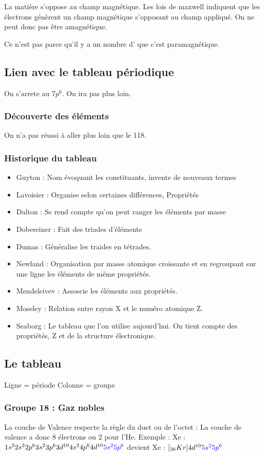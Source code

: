 \documentclass[french]{yLectureNote}
\begin{document}
La matière s'oppose au champ magnétique. Les lois de maxwell indiquent que les électrons génèrent un champ magnétique s'opposant au champ appliqué. On ne peut donc pas \^etre amagnétique.

Ce n'est pas parce qu'il y a un nombre d' que c'est paramagnétique.
\subsection{Lien avec le tableau périodique}
On s'arrete au $7p^6$. On ira pas plus loin.
\subsubsection{Découverte des éléments}
On n'a pas réussi à aller plus loin que le 118.
\subsubsection{Historique du tableau}
\begin{itemize}
 \item Guyton : Nom évoquant les constituants, invente de nouveaux termes
 \item Lavoisier : Organise selon certaines différences, Propriétés
 \item Dalton : Se rend compte qu'on peut ranger les éléments par masse
 \item Dobereiner : Fait des triades d'éléments
 \item Dumas : Généralise les traides en tétrades.
 \item Newland : Organisation par masse atomique croissante et en regroupant sur une ligne les éléments de m\^eme propriétés.
 \item Mendeleivev : Assoscie les éléments aux propriétés.
 \item Moseley : Relation entre rayon X et le numéro atomique Z.
 \item Seaborg : Le tableau que l'on utilise aujourd'hui. On tient compte des propriétés, Z et de la structure électronique.
\end{itemize}
\subsection{Le tableau}
Ligne  = période
Colonne = groupe
\subsubsection{Groupe 18 : Gaz nobles}
La couche de Valence respecte la règle du duet ou de l'octet : La couche de valence a donc 8 électrons ou 2 pour l'He.
Exemple : Xe : $1s^2 2s^2 2p^6 3s^2 3p^6 3d^{10} 4s^2 4p^6 4d^{10} {\color{blue}5s^2 5p^6}$ devient Xe : $[_{36}Kr] 4d^{10} {\color{blue}5s^2 5p^6}$
\end{document}

